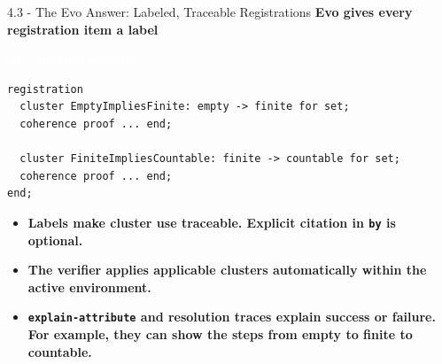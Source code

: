 \documentclass[aspectratio=169,11pt]{beamer}
\newcommand{\statusbadge}[2]{\colorbox{#1}{\textcolor{white}{\strut\scriptsize\sffamily\bfseries #2}}}
\newcommand{\badgeSpec}{\statusbadge{green!35!black}{specification example}}
\begin{document}
\begin{frame}[fragile,t]{4.3 - The Evo Answer: Labeled, Traceable Registrations}
\smallskip
\textbf{\textcolor{blue!55!black}{\textbf{Evo gives every registration item a label}}}~\badgeSpec
\begin{lstlisting}[language={mizar},basicstyle=\ttfamily\small]
registration
  cluster EmptyImpliesFinite: empty -> finite for set;
  coherence proof ... end;

  cluster FiniteImpliesCountable: finite -> countable for set;
  coherence proof ... end;
end;
\end{lstlisting}
\begin{itemize}
\setlength{\itemsep}{1pt}
\setlength{\parsep}{0pt}
\setlength{\parskip}{0pt}
\item \textcolor{blue!55!black}{\textbf{Labels make cluster use traceable. Explicit citation in \texttt{by} is optional.}}
\item \textcolor{blue!55!black}{\textbf{The verifier applies applicable clusters automatically within the active environment.}}
\item \textcolor{blue!55!black}{\textbf{\texttt{explain-attribute} and resolution traces explain success or failure. For example, they can show the steps from empty to finite to countable.}}
\end{itemize}
\end{frame}
\end{document}

